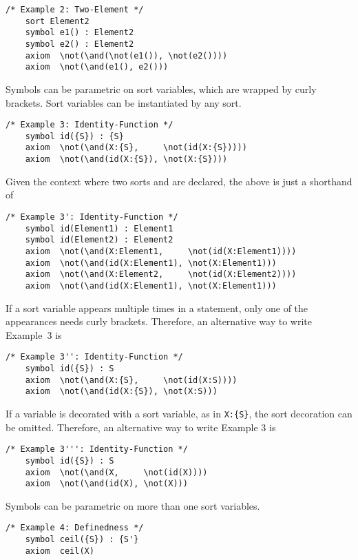\documentclass[UTF8,11pt]{article}
\theoremstyle{plain}
\theoremstyle{definition}
\theoremstyle{remark}
\begin{document}
\begin{Verbatim}[fontsize=\small]
    /* Example 2: Two-Element */
    sort Element2
    symbol e1() : Element2
    symbol e2() : Element2
    axiom  \not(\and(\not(e1()), \not(e2())))
    axiom  \not(\and(e1(), e2()))
\end{Verbatim}

Symbols can be parametric on sort variables, which are wrapped by curly brackets. 
Sort variables can be instantiated by any sort.

\begin{Verbatim}[fontsize=\small]
    /* Example 3: Identity-Function */
    symbol id({S}) : {S}
    axiom  \not(\and(X:{S},     \not(id(X:{S}))))
    axiom  \not(\and(id(X:{S}), \not(X:{S})))
\end{Verbatim}

Given the context where two sorts  and  are declared, the above is just a shorthand of

\begin{Verbatim}[fontsize=\small]
    /* Example 3': Identity-Function */
    symbol id(Element1) : Element1
    symbol id(Element2) : Element2
    axiom  \not(\and(X:Element1,     \not(id(X:Element1))))
    axiom  \not(\and(id(X:Element1), \not(X:Element1)))
    axiom  \not(\and(X:Element2,     \not(id(X:Element2))))
    axiom  \not(\and(id(X:Element1), \not(X:Element1)))
\end{Verbatim}

If a sort variable appears multiple times in a statement, only one of the appearances needs curly brackets.
Therefore, an alternative way to write Example~3 is
\begin{Verbatim}[fontsize=\small]
    /* Example 3'': Identity-Function */
    symbol id({S}) : S
    axiom  \not(\and(X:{S},     \not(id(X:S))))
    axiom  \not(\and(id(X:{S}), \not(X:S)))
\end{Verbatim}

If a variable is decorated with a sort variable, as in {\small\verb|X:{S}|}, the sort decoration can be omitted. Therefore, an alternative way to write Example 3 is
\begin{Verbatim}[fontsize=\small]
    /* Example 3''': Identity-Function */
    symbol id({S}) : S
    axiom  \not(\and(X,     \not(id(X))))
    axiom  \not(\and(id(X), \not(X)))
\end{Verbatim}

Symbols can be parametric on more than one sort variables.
\begin{Verbatim}[fontsize=\small]
    /* Example 4: Definedness */
    symbol ceil({S}) : {S'}
    axiom  ceil(X)
\end{Verbatim}
\end{document}

